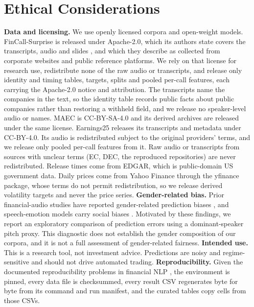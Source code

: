 \section*{Ethical Considerations}

\textbf{Data and licensing.} We use openly licensed corpora and
open-weight models. FinCall-Surprise is released under Apache-2.0,
which its authors state covers the transcripts, audio and slides
\citep[Appendix~A]{fincall2025}, and which they describe as collected
from corporate websites and public reference platforms. We rely on that
license for research use, redistribute none of the raw audio or
transcripts, and release only identity and timing tables, targets,
splits and pooled per-call features, each carrying the Apache-2.0
notice and attribution. The transcripts name the companies in the text,
so the identity table records public facts about public companies
rather than restoring a withheld field, and we release no speaker-level
audio or names. MAEC is CC-BY-SA-4.0 and its derived archives are
released under the same license. Earnings25 releases its transcripts
and metadata under CC-BY-4.0. Its audio is redistributed subject to the
original providers' terms, and we release only pooled per-call features
from it. Raw audio or transcripts from sources with unclear terms (EC,
DEC, the reproduced repositories) are never redistributed. Release
times come from EDGAR, which is public-domain US government data. Daily prices
come from Yahoo Finance through the yfinance package, whose terms do not permit
redistribution, so we release derived volatility targets and never the price
series.
\textbf{Gender-related bias.} Prior financial-audio studies have reported
gender-related prediction biases \citep{ama2024,docfin2022}, and speech-emotion
models carry social biases \citep{emobias2024}. Motivated by these findings, we
report an exploratory comparison of prediction errors using a dominant-speaker
pitch proxy. This diagnostic does not establish the gender composition of our
corpora, and it is not a full assessment of gender-related fairness. \textbf{Intended use.} This is a
research tool, not investment advice. Predictions are noisy and
regime-sensitive and should not drive automated trading.
\textbf{Reproducibility.} Given the documented reproducibility problems in
financial NLP \citep{finnlp2025survey}, the environment is pinned, every data file is
checksummed, every result CSV regenerates byte for byte from its command and run
manifest, and the curated tables copy cells from those CSVs.
